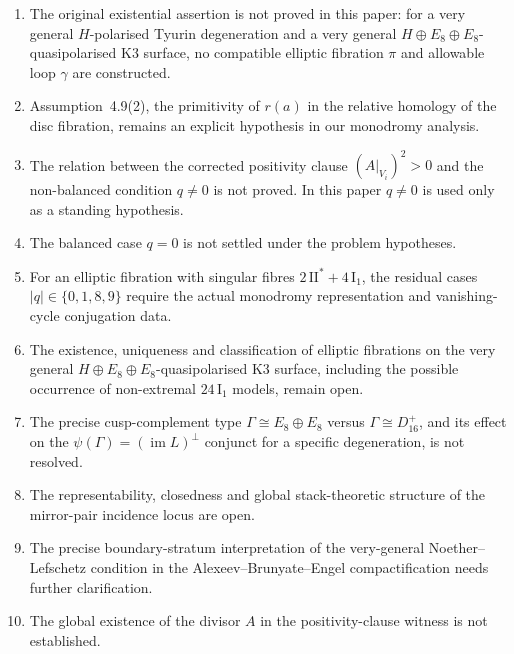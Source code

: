 \documentclass[12pt]{article}
\theoremstyle{plain}
\theoremstyle{definition}
\begin{document}
\begin{enumerate}
\item The original existential assertion is not proved in this paper: for a very general $H$-polarised Tyurin degeneration and a very general $H\oplus E_8\oplus E_8$-quasipolarised K3 surface, no compatible elliptic fibration $\pi$ and allowable loop $\gamma$ are constructed.
\item Assumption~4.9(2), the primitivity of $r(a)$ in the relative homology of the disc fibration, remains an explicit hypothesis in our monodromy analysis.
\item The relation between the corrected positivity clause $(A|_{V_i})^2>0$ and the non-balanced condition $q\neq 0$ is not proved.  In this paper $q\neq 0$ is used only as a standing hypothesis.
\item The balanced case $q=0$ is not settled under the problem hypotheses.
\item For an elliptic fibration with singular fibres $2\,\mathrm{II}^*+4\,\mathrm{I}_1$, the residual cases $|q|\in\{0,1,8,9\}$ require the actual monodromy representation and vanishing-cycle conjugation data.
\item The existence, uniqueness and classification of elliptic fibrations on the very general $H\oplus E_8\oplus E_8$-quasipolarised K3 surface, including the possible occurrence of non-extremal $24\,\mathrm{I}_1$ models, remain open.
\item The precise cusp-complement type $\Gamma\cong E_8\oplus E_8$ versus $\Gamma\cong D_{16}^+$, and its effect on the $\psi(\Gamma)=(\operatorname{im}L)^\perp$ conjunct for a specific degeneration, is not resolved.
\item The representability, closedness and global stack-theoretic structure of the mirror-pair incidence locus are open.
\item The precise boundary-stratum interpretation of the very-general Noether--Lefschetz condition in the Alexeev--Brunyate--Engel compactification needs further clarification.
\item The global existence of the divisor $A$ in the positivity-clause witness is not established.
\end{enumerate}
\end{document}
